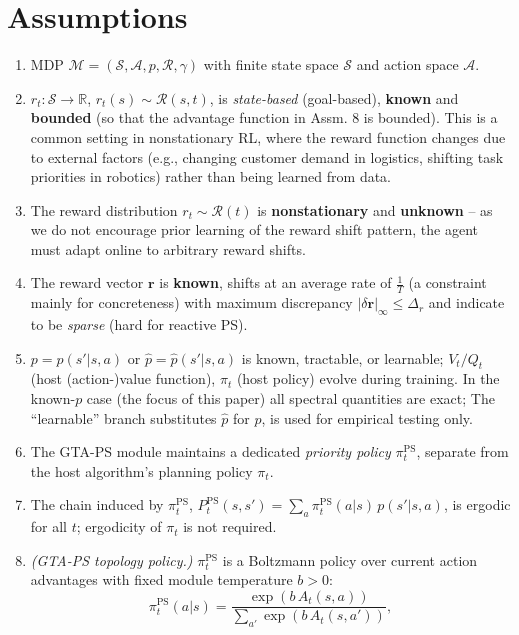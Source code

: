 \documentclass[10pt,a4paper]{article}
\begin{document}
\newpage
\section{Assumptions}
 
\begin{enumerate}\setlength\itemsep{1pt}
  \item MDP $\mathcal{M} = (\mathcal{S}, \mathcal{A}, p, \mathcal{R}, \gamma)$ with finite state space $\mathcal{S}$ and action space $\mathcal{A}$.
  \item $r_t : \mathcal{S} \to \mathbb{R}$, $r_t(s) \sim \mathcal{R}(s, t)$, is \textit{state-based} (goal-based), \textbf{known} and \textbf{bounded} (so that the advantage function in Assm. 8 is bounded).
  This is a common setting in nonstationary RL, where the reward function changes due to external factors (e.g., changing customer demand in logistics, shifting task priorities in robotics) rather than being learned from data.
  \item The reward distribution $r_t \sim \mathcal{R}(t)$ is \textbf{nonstationary} and \textbf{unknown} -- as we do not encourage prior learning of the reward shift pattern, the agent must adapt online to arbitrary reward shifts.
  \item The reward vector $\mathbf{r}$ is \textbf{known}, shifts at an average rate of $\frac{1}{T}$ (a constraint mainly for concreteness) with maximum discrepancy $|\delta \mathbf{r}|_\infty \leq \Delta_r$ and indicate to be \emph{sparse} (hard for reactive PS).
  \item $p = p(s'|s,a)$ or $\hat{p} = \hat{p}(s'|s,a)$ is known, tractable, or learnable; $V_t/Q_t$ (host (action-)value function), $\pi_t$ (host policy) evolve during training.
  In the known-$p$ case (the focus of this paper) all spectral quantities are exact;
  The ``learnable'' branch substitutes $\hat{p}$ for $p$, is used for empirical testing only.
  \item The GTA-PS module maintains a dedicated \textit{priority policy} $\pi^{\mathrm{PS}}_t$, separate from the host algorithm's planning policy $\pi_t$.
  \item The chain induced by $\pi^{\mathrm{PS}}_t$, $P^{\mathrm{PS}}_t(s,s') = \sum_a \pi^{\mathrm{PS}}_t(a|s)\,p(s'|s,a)$, is ergodic for all $t$; ergodicity of $\pi_t$ is not required.
  \item \textit{(GTA-PS topology policy.)} $\pi^{\mathrm{PS}}_t$ is a Boltzmann policy over current action advantages with fixed module temperature $b > 0$:
  \[
    \pi^{\mathrm{PS}}_t(a|s) = \frac{\exp(b\,A_t(s,a))}{\sum_{a'}\exp(b\,A_t(s,a'))},
\]
\end{enumerate}
\end{document}
